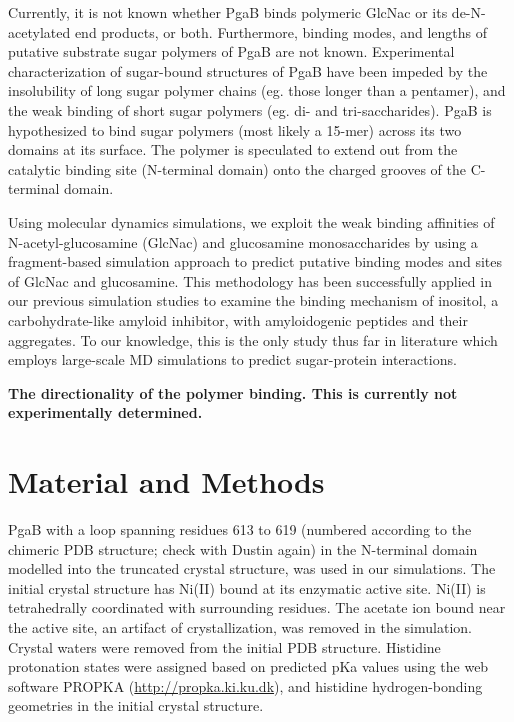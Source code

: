 Currently, it is not known whether PgaB binds polymeric GlcNac or its de-N-acetylated end products, or both. Furthermore, binding modes, and lengths of putative substrate sugar polymers of PgaB are not known. Experimental characterization of sugar-bound structures of PgaB have been impeded by the insolubility of long sugar polymer chains (eg. those longer than a pentamer), and the weak binding of short sugar polymers (eg. di- and tri-saccharides). PgaB is hypothesized to bind sugar polymers (most likely a 15-mer) across its two domains at its surface. The polymer is speculated to extend out from the catalytic binding site (N-terminal domain) onto the charged grooves of the C-terminal domain.

Using molecular dynamics simulations, we exploit the weak binding affinities of N-acetyl-glucosamine (GlcNac) and glucosamine monosaccharides by using a fragment-based simulation approach to predict putative binding modes and sites of GlcNac and glucosamine. This methodology has been successfully applied in our previous simulation studies to examine the binding mechanism of inositol, a carbohydrate-like amyloid inhibitor, with amyloidogenic peptides and their aggregates. To our knowledge, this is the only study thus far in literature which employs large-scale MD simulations to predict sugar-protein interactions.

\textbf{The directionality of the polymer binding.  This is currently not experimentally determined.} 


\section{Material and Methods}
PgaB with a loop spanning residues 613 to 619 (numbered according to the chimeric PDB structure; check with Dustin again) in the N-terminal domain modelled into the truncated crystal structure, was used in our simulations. The initial crystal structure has Ni(II) bound at its enzymatic active site. Ni(II) is tetrahedrally coordinated with surrounding residues.  The acetate ion bound near the active site, an artifact of crystallization, was removed in the simulation. Crystal waters were removed from the initial PDB structure. Histidine protonation states were assigned based on predicted pKa values using the web software PROPKA (\url{http://propka.ki.ku.dk}), and histidine hydrogen-bonding geometries in the initial crystal structure.

